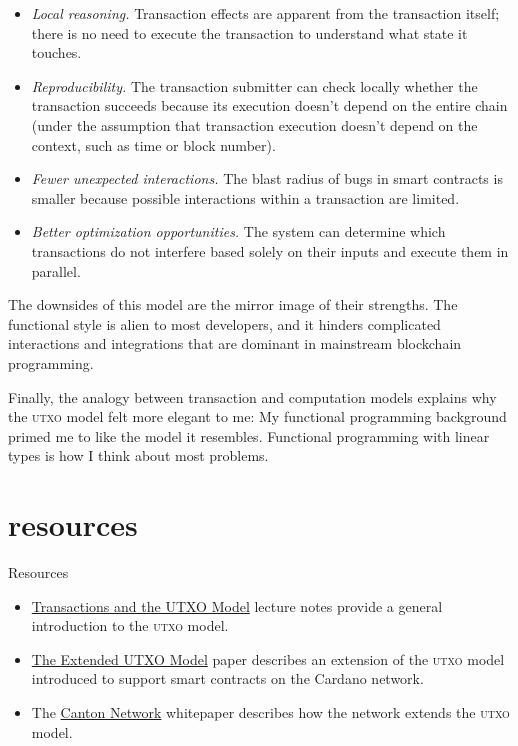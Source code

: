\documentclass{article}
\begin{document}
\begin{itemize}
  \item
    \emph{Local reasoning.}
    Transaction effects are apparent from the transaction itself;
    there is no need to execute the transaction to understand what state it touches.
  \item
    \emph{Reproducibility.}
    The transaction submitter can check locally whether the transaction succeeds because its execution doesn't depend on the entire chain
    (under the assumption that transaction execution doesn't depend on the context, such as time or block number).
  \item
    \emph{Fewer unexpected interactions.}
    The blast radius of bugs in smart contracts is smaller because possible interactions within a transaction are limited.
  \item
    \emph{Better optimization opportunities.}
    The system can determine which transactions do not interfere based solely on their inputs and execute them in parallel.
\end{itemize}

The downsides of this model are the mirror image of their strengths.
The functional style is alien to most developers,
and it hinders complicated interactions and integrations that are dominant in mainstream blockchain programming.

Finally, the analogy between transaction and computation models explains why the \textsc{utxo} model felt more elegant to me:
My functional programming background primed me to like the model it resembles.
Functional programming with linear types is how I think about most problems.

\section{resources}{Resources}

\begin{itemize}
  \item \href{https://web.stanford.edu/class/ee374/lec_notes/lec4.pdf}{Transactions and the UTXO Model} lecture notes provide a general introduction to the \textsc{utxo} model.
  \item \href{https://files.zotero.net/eyJleHBpcmVzIjoxNzIxODU0MzcwLCJoYXNoIjoiYTVhYmY4NjdiY2E2YzdkNTNjODkwNWNmZDZhYmM5MjAiLCJjb250ZW50VHlwZSI6ImFwcGxpY2F0aW9uXC9wZGYiLCJjaGFyc2V0IjoiIiwiZmlsZW5hbWUiOiJDaGFrcmF2YXJ0eSBldCBhbC4gLSAyMDIwIC0gVGhlIEV4dGVuZGVkIFVUWE8gTW9kZWwucGRmIn0%3D/a3b27bc632152d8227dc27019859f91bb2a4ff8664fcf0a277cd90785570a2c2/Chakravarty%20et%20al.%20-%202020%20-%20The%20Extended%20UTXO%20Model.pdf}{The Extended UTXO Model}
  paper describes an extension of the \textsc{utxo} model introduced to support smart contracts on the Cardano network.
  \item The \href{https://www.digitalasset.com/hubfs/Canton/Canton%20Network%20-%20White%20Paper.pdf}{Canton Network} whitepaper describes how the network extends the \textsc{utxo} model.
\end{itemize}
\end{document}
